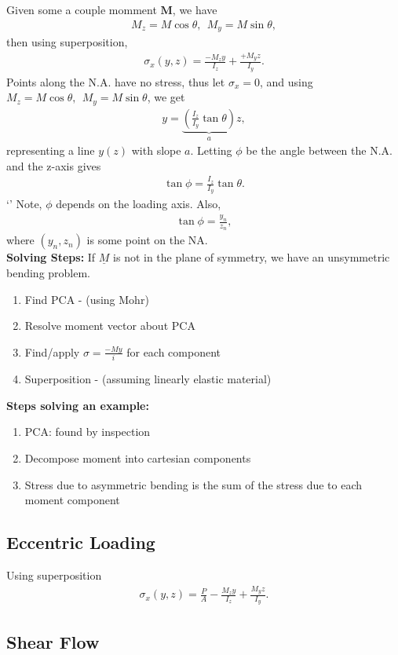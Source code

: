 \documentclass{article}
\numberwithin{equation}{subsection}
\newcommand{\bb}[1]{\mathbf{#1}}
\begin{document}
Given some a couple momment $\bb{M}$, we have
\begin{align*}
  M_z = M\cos\theta,~~ M_y = M\sin\theta,
\end{align*}
then using superposition,
\begin{align*}
  \sigma_x(y,z) = \frac{-M_z y}{I_z} + \frac{+M_y z}{I_y}.
\end{align*}
Points along the N.A. have no stress, thus let $\sigma_x = 0$, and using
$M_z = M\cos\theta,~~ M_y = M\sin\theta$, we get
\begin{align*}
  y = \underbrace{\left(\frac{I_z}{I_y}\tan\theta\right)}_a z,
\end{align*}
representing a line $y(z)$ with slope $a$.
Letting $\phi$ be the angle between the N.A. and the z-axis gives
\begin{align*}
  \tan\phi = \frac{I_z}{I_y}\tan\theta.
\end{align*}`'
Note, $\phi$ depends on the loading axis. Also,
\begin{align*}
  \tan\phi = \frac{y_n}{z_n},
\end{align*}
where $(y_n, z_n)$ is some point on the NA.
\\

\textbf{Solving Steps:}
If ${\underline{M}}$ is not in the plane of symmetry, we have an unsymmetric bending problem.
\begin{enumerate}
  \item Find PCA - (using Mohr)
  \item Resolve moment vector about PCA
  \item Find/apply $\sigma = \frac{-My}{i}$ for each component
  \item Superposition - (assuming linearly elastic material)
\end{enumerate}

\textbf{Steps solving an example:}
\begin{enumerate}
  \item PCA: found by inspection
  \item Decompose moment into cartesian components
  \item Stress due to asymmetric bending is the sum of the stress due to each moment component
\end{enumerate}

\subsection{Eccentric Loading}
Using superposition
\begin{align*}
  \sigma_x(y,z) = \frac{P}{A} - \frac{M_z y}{I_z} + \frac{M_y z}{I_y}.
\end{align*}


\subsection{Shear Flow}
\end{document}

